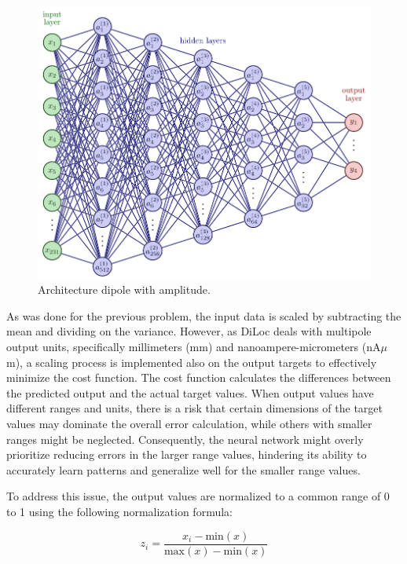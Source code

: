 \documentclass[a4paper, UKenglish, 11pt]{uiomaster}
\begin{document}
\begin{figure}[!htb]
    \centering
    \includegraphics[width=\linewidth]{figures/NN_dipole_w_amplitude_architecture.pdf}
    \caption{Architecture dipole with amplitude.}
    \label{fig:NN_dipole_w_amplitude_architecture}
\end{figure}

As was done for the previous problem, the input data is scaled by subtracting the mean and dividing on the variance. However, as DiLoc deals with multipole output units, specifically millimeters (mm) and nanoampere-micrometers (nA$\mu$m), a scaling process is implemented also on the output targets to effectively minimize the cost function. The cost function calculates the differences between the predicted output and the actual target values. When output values have different ranges and units, there is a risk that certain dimensions of the target values may dominate the overall error calculation, while others with smaller ranges might be neglected. Consequently, the neural network might overly prioritize reducing errors in the larger range values, hindering its ability to accurately learn patterns and generalize well for the smaller range values.

To address this issue, the output values are normalized to a common range of 0 to 1 using the following normalization formula:

\begin{equation}
z_i = \frac{x_i - \text{min}(x)}{\text{max}(x) - \text{min}(x)}
\label{eq:scale_target}
\end{equation}
\end{document}
